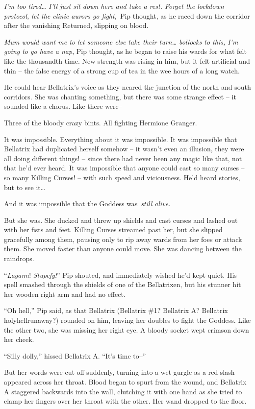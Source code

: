 \emph{I'm too tired\ldots{} I'll just sit down here and take a rest.
Forget the lockdown protocol, let the clinic aurors go fight,}~Pip
thought, as he raced down the corridor after the vanishing Returned,
slipping on blood.

\emph{Mum would want me to let someone else take their turn\ldots{}
bollocks to this, I'm going to go have a nap}, Pip thought, as he began
to raise his wards for what felt like the thousandth time. New strength
was rising in him, but it felt artificial and thin -- the false energy
of a strong cup of tea in the wee hours of a long watch.

He could hear Bellatrix's voice as they neared the junction of the north
and south corridors. She was chanting something, but there was some
strange effect -- it sounded like a chorus. Like there were--

Three of the bloody crazy bints. All fighting Hermione Granger.

It was impossible. Everything about it was impossible. It was impossible
that Bellatrix had duplicated herself somehow -- it wasn't even an
illusion, they were all doing different things! -- since there had never
been any magic like that, not that he'd ever heard. It was impossible
that anyone could cast so many curses -- so many Killing Curses! -- with
such speed and viciousness. He'd heard stories, but to see it\ldots{}

And it was impossible that the Goddess was~\emph{still alive.}

But she was. She ducked and threw up shields and cast curses and lashed
out with her fists and feet. Killing Curses streamed past her, but she
slipped gracefully among them, pausing only to rip away wards from her
foes or attack them. She moved faster than anyone could move. She was
dancing between the raindrops.

``\emph{Lagann}! \emph{Stupefy!}'' Pip shouted, and immediately wished
he'd kept quiet. His spell smashed through the shields of one of the
Bellatrixen, but his stunner hit her wooden right arm and had no effect.

``Oh hell,'' Pip said, as that Bellatrix (Bellatrix \#1? Bellatrix A?
Bellatrix holyhellrunaway?) rounded on him, leaving her doubles to fight
the Goddess. Like the other two, she was missing her right eye. A bloody
socket wept crimson down her cheek.

``Silly dolly,'' hissed Bellatrix A. ``It's time to--''

But her words were cut off suddenly, turning into a wet gurgle as a red
slash appeared across her throat. Blood began to spurt from the wound,
and Bellatrix A staggered backwards into the wall, clutching it with one
hand as she tried to clamp her fingers over her throat with the other.
Her wand dropped to the floor.

